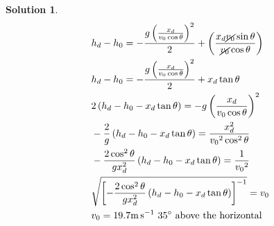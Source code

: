 \documentclass[10pt]{article}
\theoremstyle{definition}
\newtheorem{soln}{Solution}
\begin{document}
\begin{soln}
\begin{align*}
           & h_d-h_0=-\frac{g\left(\frac{x_d}{{v_0}\cos\theta}\right)^2}{2}+\left(\frac{x_d\cancel{{v_0}}\sin\theta}{\cancel{{v_0}}\cos\theta}\right) \\
           & h_d-h_0=-\frac{g\left(\frac{x_d}{{v_0}\cos\theta}\right)^2}{2}+x_d\tan\theta                                                             \\
           & 2\left(h_d-h_0-x_d\tan\theta\right)=-g\left(\frac{x_d}{{v_0}\cos\theta}\right)^2                                                         \\
           & -\frac{2}{g}\left(h_d-h_0-x_d\tan\theta\right)=\frac{x_d^2}{{v_0}^2\cos^2\theta}                                                         \\
           & -\frac{2\cos^2\theta}{gx_d^2}\left(h_d-h_0-x_d\tan\theta\right)=\frac{1}{{v_0}^2}                                                        \\
           & \sqrt{\left[-\frac{2\cos^2\theta}{gx_d^2}\left(h_d-h_0-x_d\tan\theta\right)\right]^{-1}}={v_0}                                           \\
           & v_0=19.7\unit{\meter\per\second}\text{ 35\unit{\degree} above the horizontal }                                                           \\
     \end{align*}
\end{soln}
\end{document}

